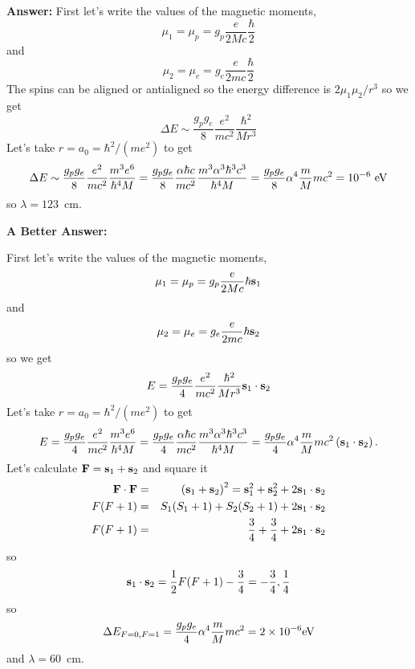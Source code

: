\documentclass{article}
\newcommand{\rmmat}[1]{\hbox{\rm #1}}
\begin{document}
\begin{enumerate}
{\bf Answer:}
First let's write the values of the magnetic moments,
\begin{equation}
\mu_1 = \mu_p = g_p \frac{e}{2 M c} \frac{\hbar}{2}
\end{equation}
and 
\begin{equation}
\mu_2 = \mu_e = g_e \frac{e}{2 m c} \frac{\hbar}{2}
\end{equation}
The spins can be aligned or antialigned so the energy difference
is $2 \mu_1 \mu_2 / r^3$ so we get
\begin{equation}
\Delta E \sim \frac{g_p g_e}{8} \frac{e^2}{m c^2} \frac{\hbar^2}{M r^3}
\end{equation}
Let's take $r=a_0=\hbar^2/(me^2)$ to get
\begin{equation}
\Delta E \sim \frac{g_p g_e}{8} \frac{e^2}{m c^2} \frac{m^3 e^6}{\hbar^4 M} = 
\frac{g_p g_e}{8} \frac{\alpha \hbar c}{m c^2} \frac{m^3 \alpha^3
  \hbar^3 c^3}{\hbar^4 M}
 =  \frac{g_p g_e}{8} \alpha^4 \frac{m}{M} m c^2 = 10^{-6}~\rmmat{eV} 
\end{equation}
so $\lambda=123$~cm.

{\bf A Better Answer:}

First let's write the values of the magnetic moments,
\begin{equation}
\mu_1 = \mu_p = g_p \frac{e}{2 M c} \hbar {\bf s}_1
\end{equation}
and 
\begin{equation}
\mu_2 = \mu_e = g_e \frac{e}{2 m c} \hbar {\bf s}_2
\end{equation}
so we get
\begin{equation}
E = \frac{g_p g_e}{4} \frac{e^2}{m c^2} \frac{\hbar^2}{M r^3} {\bf
  s}_1 \cdot {\bf s}_2
\end{equation}
Let's take $r=a_0=\hbar^2/(me^2)$ to get
\begin{equation}
E = \frac{g_p g_e}{4} \frac{e^2}{m c^2} \frac{m^3 e^6}{\hbar^4 M} = 
\frac{g_p g_e}{4} \frac{\alpha \hbar c}{m c^2} \frac{m^3 \alpha^3
  \hbar^3 c^3}{\hbar^4 M}
 =  \frac{g_p g_e}{4} \alpha^4 \frac{m}{M} m c^2 \left ({\bf
  s}_1 \cdot {\bf s}_2 \right ).
\end{equation}
Let's calculate ${\bf F} = {\bf s}_1 + {\bf s}_2$ and square it
\begin{eqnarray}
{\bf F} \cdot {\bf F} &=&
\left ( {\bf s}_1 + {\bf s}_2 \right )^2 = 
{\bf s}_1^2 + {\bf s}_2^2 + 2 {\bf s}_1 \cdot {\bf s}_2 \\
F (F+1)  &=& S_1 (S_1 + 1)  + S_2 (S_2 + 1) + 2 {\bf s}_1 \cdot {\bf
  s}_2 \\
F(F+1) &=& \frac{3}{4} + \frac{3}{4} + 2 {\bf s}_1 \cdot {\bf
  s}_2
\end{eqnarray}
so
\begin{equation}
{\bf s}_1 \cdot {\bf s}_2 = \frac{1}{2} F(F+1) - \frac{3}{4}
= -\frac{3}{4}, \frac{1}{4}
\end{equation}
so
\begin{equation}
\Delta E_{F=0,F=1} = 
  \frac{g_p g_e}{4} \alpha^4 \frac{m}{M} m c^2 = 2 \times 10^{-6} \rmmat{eV}
\end{equation}
and $\lambda = 60$~cm.


\end{enumerate}
\end{document}
